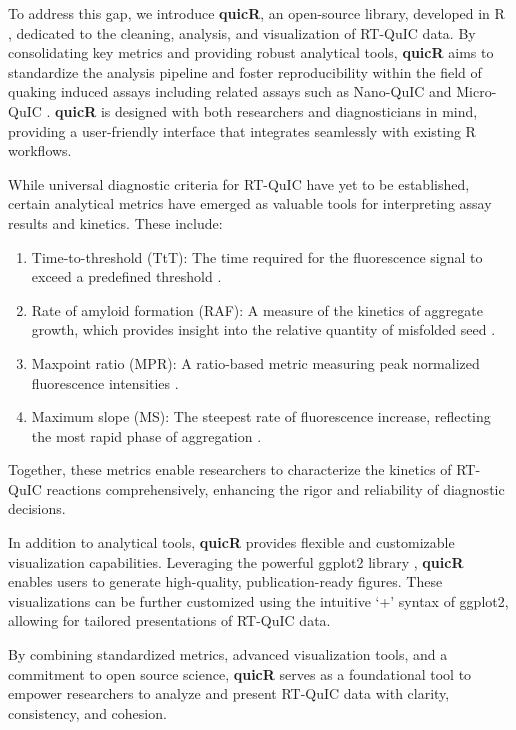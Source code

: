 \documentclass[preprint,12pt,a4paper]{elsarticle}
\begin{document}
        To address this gap, we introduce \textbf{quicR}, an open-source library, developed in R \cite{R2024}, dedicated to the cleaning, analysis, and visualization of RT-QuIC data. By consolidating key metrics and providing robust analytical tools, \textbf{quicR} aims to standardize the analysis pipeline and foster reproducibility within the field of quaking induced assays including related assays such as Nano-QuIC \cite{Christenson2023} and Micro-QuIC \cite{Lee2024}. \textbf{quicR} is designed with both researchers and diagnosticians in mind, providing a user-friendly interface that integrates seamlessly with existing R workflows.

        While universal diagnostic criteria for RT-QuIC have yet to be established, certain analytical metrics have emerged as valuable tools for interpreting assay results and kinetics. These include:

        \begin{enumerate}
            \item Time-to-threshold (TtT): The time required for the fluorescence signal to exceed a predefined threshold \cite{Orru2015}.
            \item Rate of amyloid formation (RAF): A measure of the kinetics of aggregate growth, which provides insight into the relative quantity of misfolded seed \cite{Gallups2022}.
            \item Maxpoint ratio (MPR): A ratio-based metric measuring peak normalized fluorescence intensities \cite{Rowden2023}.
            \item Maximum slope (MS): The steepest rate of fluorescence increase, reflecting the most rapid phase of aggregation \cite{Henderson2015}.
        \end{enumerate}

        Together, these metrics enable researchers to characterize the kinetics of RT-QuIC reactions comprehensively, enhancing the rigor and reliability of diagnostic decisions.

        In addition to analytical tools, \textbf{quicR} provides flexible and customizable visualization capabilities. Leveraging the powerful ggplot2 library \cite{ggplot2016}, \textbf{quicR} enables users to generate high-quality, publication-ready figures. These visualizations can be further customized using the intuitive `+' syntax of ggplot2, allowing for tailored presentations of RT-QuIC data.

        By combining standardized metrics, advanced visualization tools, and a commitment to open source science, \textbf{quicR} serves as a foundational tool to empower researchers to analyze and present RT-QuIC data with clarity, consistency, and cohesion.
\end{document}
